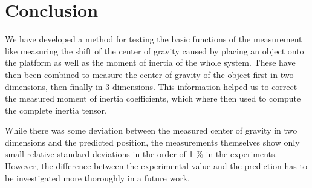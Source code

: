 \documentclass[journal]{IEEEtran}
\begin{document}
%



\section{Conclusion}

We have developed a method for testing the basic functions of the measurement like measuring the shift of the center of gravity caused by placing an object onto the platform as well as the moment of inertia of the whole system.
These have then been combined to measure the center of gravity of the object first in two dimensions, then finally in 3 dimensions.
This information helped us to correct the measured moment of inertia coefficients, which where then used to compute the complete inertia tensor.

While there was some deviation between the measured center of gravity in two dimensions and the predicted position, the measurements themselves show only small relative standard deviations in the order of 1 \% in the experiments.
However, the difference between the experimental value and the prediction has to be investigated more thoroughly in a future work.
\end{document}
